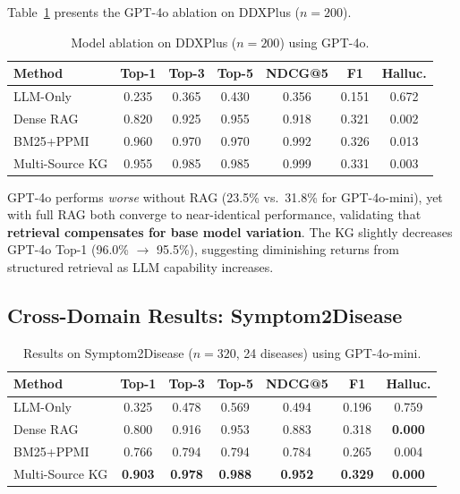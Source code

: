 \documentclass[runningheads]{llncs}
\begin{document}
Table~\ref{tab:gpt4o} presents the GPT-4o ablation on DDXPlus ($n{=}200$).

\begin{table}[t]
\centering
\caption{Model ablation on DDXPlus ($n{=}200$) using GPT-4o.}
\label{tab:gpt4o}
\begin{tabular}{lcccccc}
\toprule
\textbf{Method} & \textbf{Top-1} & \textbf{Top-3} & \textbf{Top-5} & \textbf{NDCG@5} & \textbf{F1} & \textbf{Halluc.} \\
\midrule
LLM-Only       & 0.235 & 0.365 & 0.430 & 0.356 & 0.151 & 0.672 \\
Dense RAG       & 0.820 & 0.925 & 0.955 & 0.918 & 0.321 & 0.002 \\
BM25+PPMI       & 0.960 & 0.970 & 0.970 & 0.992 & 0.326 & 0.013 \\
Multi-Source KG & 0.955 & 0.985 & 0.985 & 0.999 & 0.331 & 0.003 \\
\bottomrule
\end{tabular}
\end{table}

GPT-4o performs \emph{worse} without RAG (23.5\% vs.\ 31.8\% for GPT-4o-mini), yet with full RAG both converge to near-identical performance, validating that \textbf{retrieval compensates for base model variation}. The KG slightly decreases GPT-4o Top-1 (96.0\% $\to$ 95.5\%), suggesting diminishing returns from structured retrieval as LLM capability increases.

\subsection{Cross-Domain Results: Symptom2Disease}
\label{sec:cross_domain}

\begin{table}[t]
\centering
\caption{Results on Symptom2Disease ($n{=}320$, 24 diseases) using GPT-4o-mini.}
\label{tab:s2d}
\begin{tabular}{lcccccc}
\toprule
\textbf{Method} & \textbf{Top-1} & \textbf{Top-3} & \textbf{Top-5} & \textbf{NDCG@5} & \textbf{F1} & \textbf{Halluc.} \\
\midrule
LLM-Only       & 0.325 & 0.478 & 0.569 & 0.494 & 0.196 & 0.759 \\
Dense RAG       & 0.800 & 0.916 & 0.953 & 0.883 & 0.318 & \textbf{0.000} \\
BM25+PPMI       & 0.766 & 0.794 & 0.794 & 0.784 & 0.265 & 0.004 \\
Multi-Source KG & \textbf{0.903} & \textbf{0.978} & \textbf{0.988} & \textbf{0.952} & \textbf{0.329} & \textbf{0.000} \\
\bottomrule
\end{tabular}
\end{table}
\end{document}

